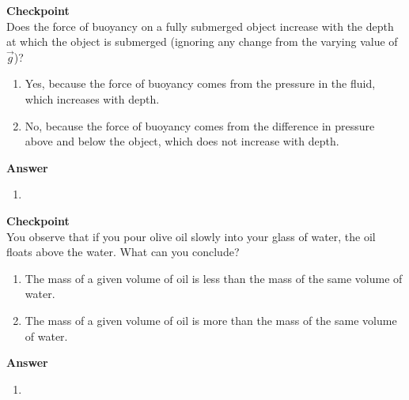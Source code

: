 \begin{framed}
\textbf{Checkpoint}\\
Does the force of buoyancy on a fully submerged object increase with the depth at which the object is submerged (ignoring any change from the varying value of $\vec g$)?

\begin{enumerate}
\item Yes, because the force of buoyancy comes from the pressure in the fluid, which increases with depth.
\item No, because the force of buoyancy comes from the difference in pressure above and below the object, which does not increase with depth.
\end{enumerate}

\begin{framed}
\textbf{Answer}\\
\begin{enumerate}[resume]
\item
\end{enumerate}
\end{framed}
\end{framed}

\begin{framed}
\textbf{Checkpoint}\\
You observe that if you pour olive oil slowly into your glass of water, the oil floats above the water. What can you conclude?

\begin{enumerate}
\item The mass of a given volume of oil is less than the mass of the same volume of water.
\item The mass of a given volume of oil is more than the mass of the same volume of water.
\end{enumerate}

\begin{framed}
\textbf{Answer}\\
\begin{enumerate}
\item
\end{enumerate}
\end{framed}
\end{framed}

